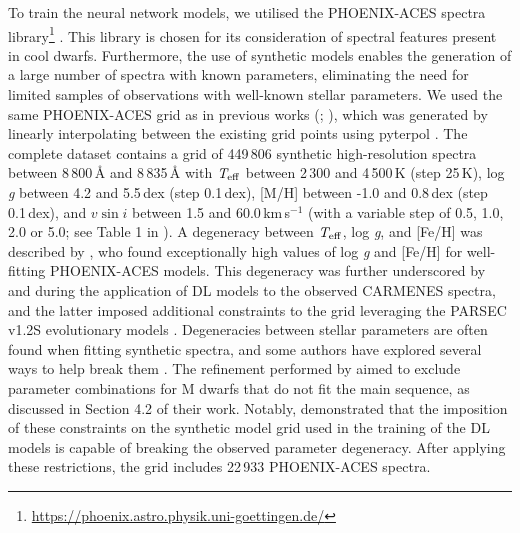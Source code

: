 To train the neural network models, we utilised the PHOENIX-ACES spectra library\footnote{\url{https://phoenix.astro.physik.uni-goettingen.de/}} \citep{Husser2013}. This library is chosen for its consideration of spectral features present in cool dwarfs. Furthermore, the use of synthetic models enables the generation of a large number of spectra with known parameters, eliminating the need for limited samples of observations with well-known stellar parameters. We used the same PHOENIX-ACES grid as in previous works (; ), which was generated by linearly interpolating between the existing grid points using {\ttfamily pyterpol} \citep{Nemravov2016}. The complete dataset contains a grid of 449\,806 synthetic high-resolution spectra between 8\,800\,{\AA} and 8\,835\,{\AA} with $\textit{T}_{\rm eff}$ between 2\,300 and 4\,500\,K (step 25\,K), log \textit{g} between 4.2 and 5.5\,dex (step 0.1\,dex), [M/H] between -1.0 and 0.8\,dex (step 0.1\,dex), and $\textit{v}\sin{i}$ between 1.5 and 60.0\,km\,s$^{-1}$ (with a variable step of 0.5, 1.0, 2.0 or 5.0; see Table 1 in ). A degeneracy between $\textit{T}_{\rm eff}$, log \textit{g}, and [Fe/H] was described by \citet{pass18}, who found exceptionally high values of log \textit{g} and [Fe/H] for well-fitting PHOENIX-ACES models. This degeneracy was further underscored by  and  during the application of DL models to the observed CARMENES spectra, and the latter imposed additional constraints to the grid leveraging the PARSEC v1.2S evolutionary models \citep{parsec2012,Chen2014,Chen2015,Tang2014}. Degeneracies between stellar parameters are often found when fitting synthetic spectra, and some authors have explored several ways to help break them \citep{buzzoni2001,brewer2015}. The refinement performed by  aimed to exclude parameter combinations for M dwarfs that do not fit the main sequence, as discussed in Section 4.2 of their work. Notably,  demonstrated that the imposition of these constraints on the synthetic model grid used in the training of the DL models is capable of breaking the observed parameter degeneracy. After applying these restrictions, the grid includes 22\,933 PHOENIX-ACES spectra.

